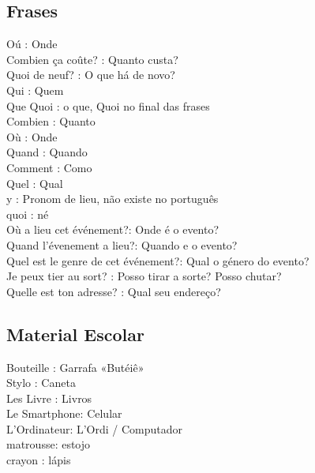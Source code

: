 \documentclass{article}
\begin{document}
    \subsection{Frases}
                                Oú                   : Onde\\
                        Combien ça coûte?            : Quanto custa?\\
                        Quoi    de neuf?             : O que há de novo?\\
                                Qui                  : Quem\\
                        Que     Quoi                 : o que,          Quoi no final das frases\\
                                Combien              : Quanto\\
                                Où                   : Onde\\
                                Quand                : Quando\\
                                Comment              : Como\\
                                Quel                 : Qual\\
                                y                    : Pronom de lieu, não existe no português\\
                                quoi                 : né\\
                        Où      a lieu cet événement?: Onde é o evento?\\
        Quand l'évenement a lieu?: Quando e o evento?\\
        Quel   est le genre de cet événement?: Qual o género do evento?\\
        Je     peux tier au sort?            : Posso tirar a sorte? Posso chutar?\\
        Quelle est ton adresse?              : Qual seu endereço?\\

    \subsection{Material Escolar}
                    Bouteille : Garrafa «Butéiê»\\
                    Stylo     : Caneta\\
                Les Livre     : Livros\\
                Le  Smartphone: Celular\\
        L'Ordinateur: L'Ordi / Computador\\
        matrousse: estojo\\
        crayon   : lápis
        
\end{document}
